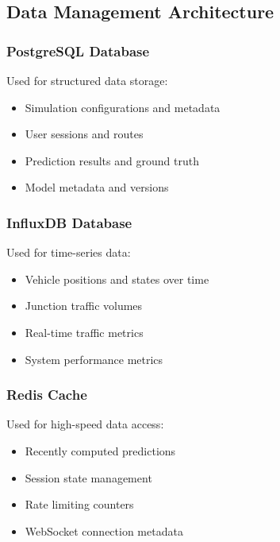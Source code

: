 \subsection{Data Management Architecture}

\subsubsection{PostgreSQL Database}

Used for structured data storage:
\begin{itemize}
    \item Simulation configurations and metadata
    \item User sessions and routes
    \item Prediction results and ground truth
    \item Model metadata and versions
\end{itemize}

\subsubsection{InfluxDB Database}

Used for time-series data:
\begin{itemize}
    \item Vehicle positions and states over time
    \item Junction traffic volumes
    \item Real-time traffic metrics
    \item System performance metrics
\end{itemize}

\subsubsection{Redis Cache}

Used for high-speed data access:
\begin{itemize}
    \item Recently computed predictions
    \item Session state management
    \item Rate limiting counters
    \item WebSocket connection metadata
\end{itemize}

